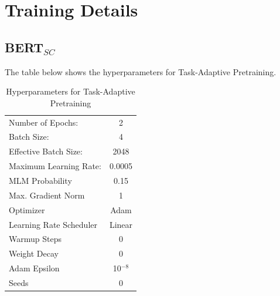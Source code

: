 \documentclass{report}
\theoremstyle{definition}
\theoremstyle{remark}
\begin{document}
\newpage
\chapter{Training Details}
\section{BERT$_{SC}$}
\label{sec:app:bertsc}
The table below shows the hyperparameters for Task-Adaptive Pretraining.
\begin{table}[h!]
    \centering
    \begin{tabular}{|lc|}
    \hline
     Number of Epochs: & 2  \\
     Batch Size: & 4\\
     Effective Batch Size: & 2048 \\
     Maximum Learning Rate: & 0.0005 \\
     MLM Probability & 0.15 \\
     Max. Gradient Norm & 1 \\
     Optimizer & Adam \cite{adamopt} \\
     Learning Rate Scheduler & Linear \\
     Warmup Steps & 0 \\
     Weight Decay & 0 \\
     Adam Epsilon & 10$^{-8}$ \\
     Seeds & 0 \\

     \hline
    \end{tabular}
    \caption{Hyperparameters for Task-Adaptive Pretraining}
    \label{tab:pretrainhyper}
\end{table}
\newpage
\end{document}
